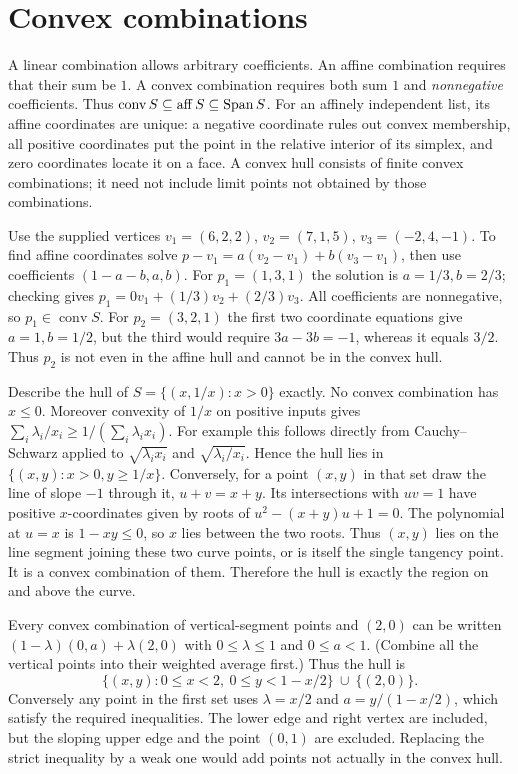 \section{Convex combinations}
A linear combination allows arbitrary coefficients. An affine combination
requires that their sum be $1$. A convex combination requires both sum $1$
and \emph{nonnegative} coefficients. Thus
$\operatorname{conv}S\subseteq\operatorname{aff}S\subseteq\operatorname{Span} S$.
For an affinely independent list, its affine coordinates are unique: a
negative coordinate rules out convex membership, all positive coordinates
put the point in the relative interior of its simplex, and zero coordinates
locate it on a face. A convex hull consists of finite convex combinations;
it need not include limit points not obtained by those combinations.

Use the supplied vertices $v_1=(6,2,2)$, $v_2=(7,1,5)$, $v_3=(-2,4,-1)$.
To find affine coordinates solve
$p-v_1=a(v_2-v_1)+b(v_3-v_1)$, then use coefficients $(1-a-b,a,b)$.
For $p_1=(1,3,1)$ the solution is $a=1/3,b=2/3$; checking gives
$p_1=0v_1+(1/3)v_2+(2/3)v_3$. All coefficients are nonnegative, so
$p_1\in\operatorname{conv}S$.
For $p_2=(3,2,1)$ the first two coordinate equations give $a=1,b=1/2$,
but the third would require $3a-3b=-1$, whereas it equals $3/2$.
Thus $p_2$ is not even in the affine hull and cannot be in the convex hull.

\goal Describe the hull of $S=\{(x,1/x):x>0\}$ exactly.
No convex combination has $x\le0$. Moreover convexity of $1/x$ on positive
inputs gives $\sum_i\lambda_i/x_i\ge1/(\sum_i\lambda_ix_i)$.
For example this follows directly from Cauchy--Schwarz applied to
$\sqrt{\lambda_ix_i}$ and $\sqrt{\lambda_i/x_i}$.
Hence the hull lies in $\{(x,y):x>0,y\ge1/x\}$.
Conversely, for a point $(x,y)$ in that set draw the line of slope $-1$
through it, $u+v=x+y$. Its intersections with $uv=1$ have positive
$x$-coordinates given by roots of $u^2-(x+y)u+1=0$.
The polynomial at $u=x$ is $1-xy\le0$, so $x$ lies between the two
roots. Thus $(x,y)$ lies on the line segment joining these two curve
points, or is itself the single tangency point. It is a convex combination
of them. Therefore the hull is exactly the region on and above the curve.

Every convex combination of vertical-segment points and $(2,0)$ can be
written $(1-\lambda)(0,a)+\lambda(2,0)$ with
$0\le\lambda\le1$ and $0\le a<1$. (Combine all the vertical points
into their weighted average first.) Thus the hull is
\[
 \{(x,y):0\le x<2,\ 0\le y<1-x/2\}\ \cup\ \{(2,0)\}.
\]
Conversely any point in the first set uses $\lambda=x/2$ and
$a=y/(1-x/2)$, which satisfy the required inequalities.
The lower edge and right vertex are included, but the sloping upper edge
and the point $(0,1)$ are excluded. Replacing the strict inequality by a
weak one would add points not actually in the convex hull.

